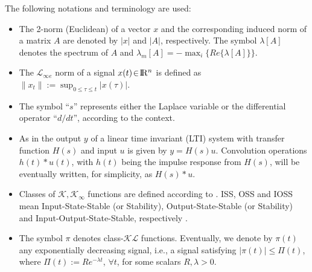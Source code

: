 \documentclass[letterpaper, 10 pt, journal, twocolumn]{IEEEtran}  %
\def\re{{\rm I}\! {\rm R}}
\theoremstyle{plain}
\theoremstyle{definition}
\theoremstyle{remark}
\begin{document}
The following notations and terminology are used:%




\begin{itemize}

\item The 2-norm (Euclidean) of a vector $x$ and the corresponding
induced norm of a matrix $A$ are denoted by $|x|$ and $|A|$,
respectively. The symbol $\lambda[A]$ denotes the spectrum of $A$
and $\lambda_m[A]=-\max_i\{Re\{\lambda[A]\}\}$.


\item The ${\mathcal{L}}_{\infty e}$ norm of a signal
$x(t)\!\in\!\re^n$ is defined as
$\|x_{t}\|\!:=\!\sup_{0\!\leq\!\tau\!\leq\!t} |x(\tau)|$.


\item  The symbol  ``$s$'' represents either the
Laplace variable or the differential operator ``$d/dt$'', according
to the context. 

\item As in \cite{IS:96} the output $y$ of a linear time invariant (LTI) system with transfer function
$H(s)$ and input $u$ is given by $y=H(s)u$. Convolution operations $h(t)*u(t)$, with $h(t)$ being the impulse response from $H(s)$, will be eventually written, for simplicity, as $H(s)*u$.


\item Classes of $\mathcal{K}, \mathcal{K}_\infty$ functions are
defined according to \cite[p.~144]{K:02}. ISS, OSS and IOSS mean
Input-State-Stable (or Stability), Output-State-Stable (or
Stability) and Input-Output-State-Stable, respectively
\cite{SW:95}.


\item The symbol $\pi$ denotes class-$\mathcal{KL}$ functions. Eventually, we denote by $\pi (t)$ any exponentially decreasing signal, i.e., a signal satisfying $|\pi(t)| \leq \Pi(t)$, where $\Pi(t):=R e^{-\lambda t}$, $\forall t$, for  some scalars $R,\lambda>0$.
\end{itemize}
\end{document}
